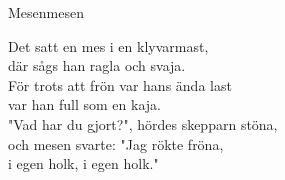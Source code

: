 \begin{song}{Mesen}{mesen}
\begin{vers}
Det satt en mes i en klyvarmast,\\
där sågs han ragla och svaja.\\
För trots att frön var hans ända last\\
var han full som en kaja.\\
"Vad har du gjort?", hördes skepparn stöna,\\
och mesen svarte: "Jag rökte fröna,\\
i egen holk, i egen holk."\\
\end{vers}
\end{song}
